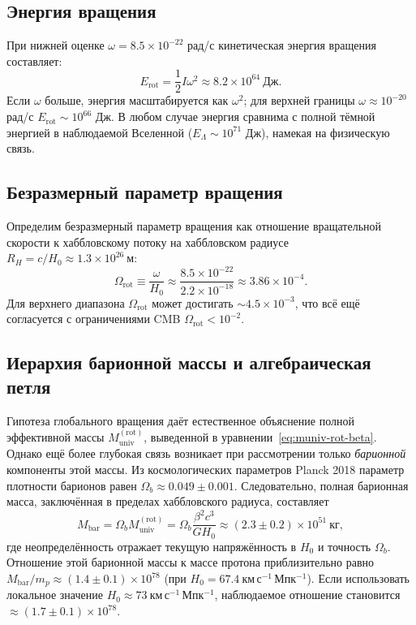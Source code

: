 \documentclass[11pt,a4paper]{article}
\newcommand{\Omegarot}{\Omega_{\mathrm{rot}}}
\begin{document}
	\subsection{Энергия вращения}
	
	При нижней оценке \(\omega = 8.5\times10^{-22}\) рад/с кинетическая энергия вращения составляет:
	\begin{equation}
		E_{\text{rot}} = \frac{1}{2} I \omega^2 \approx 8.2 \times 10^{64}\ \text{Дж}.
	\end{equation}
	Если \(\omega\) больше, энергия масштабируется как \(\omega^2\); для верхней границы \(\omega \approx 10^{-20}\) рад/с \(E_{\text{rot}} \sim 10^{66}\) Дж. В любом случае энергия сравнима с полной тёмной энергией в наблюдаемой Вселенной (\(E_{\Lambda} \sim 10^{71}\) Дж), намекая на физическую связь.
	
	\subsection{Безразмерный параметр вращения}
	
	Определим безразмерный параметр вращения как отношение вращательной скорости к хаббловскому потоку на хаббловском радиусе \(R_H = c/H_0 \approx 1.3\times10^{26}\ \text{м}\):
	\begin{equation}
		\Omegarot \equiv \frac{\omega}{H_0} \approx \frac{8.5\times10^{-22}}{2.2\times10^{-18}} \approx 3.86\times10^{-4}.
	\end{equation}
	Для верхнего диапазона \(\Omegarot\) может достигать \(\sim 4.5\times10^{-3}\), что всё ещё согласуется с ограничениями CMB \(\Omegarot < 10^{-2}\).
	
	\subsection{Иерархия барионной массы и алгебраическая петля}
	\label{subsec:baryon-hierarchy}
	
	Гипотеза глобального вращения даёт естественное объяснение полной эффективной массы \(M_{\mathrm{univ}}^{\mathrm{(rot)}}\), выведенной в уравнении~\eqref{eq:muniv-rot-beta}. Однако ещё более глубокая связь возникает при рассмотрении только \emph{барионной} компоненты этой массы. Из космологических параметров Planck 2018 параметр плотности барионов равен \(\Omega_b \approx 0.049 \pm 0.001\). Следовательно, полная барионная масса, заключённая в пределах хаббловского радиуса, составляет
	\begin{equation}
		M_{\mathrm{bar}} = \Omega_b M_{\mathrm{univ}}^{\mathrm{(rot)}} = \Omega_b \frac{\beta^2 c^3}{G H_0} \approx (2.3 \pm 0.2) \times 10^{51}\ \mathrm{кг},
	\end{equation}
	где неопределённость отражает текущую напряжённость в \(H_0\) и точность \(\Omega_b\). Отношение этой барионной массы к массе протона приблизительно равно \(M_{\mathrm{bar}}/m_p \approx (1.4 \pm 0.1) \times 10^{78}\) (при \(H_0 = 67.4\ \mathrm{км\,с^{-1}\,Мпк^{-1}}\)). Если использовать локальное значение \(H_0 \approx 73\ \mathrm{км\,с^{-1}\,Мпк^{-1}}\), наблюдаемое отношение становится \(\approx (1.7 \pm 0.1) \times 10^{78}\).
	
\end{document}
